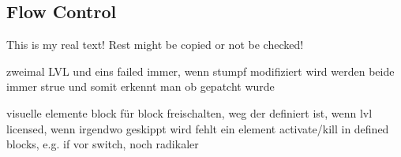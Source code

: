 \subsection{Flow Control} \label{subsection:counter-modifications-flow}
This is my real text! Rest might be copied or not be checked!


zweimal LVL und eins failed immer, wenn stumpf modifiziert wird werden beide immer strue und somit erkennt man ob gepatcht wurde

visuelle elemente block für block freischalten, weg der definiert ist, wenn lvl licensed, wenn irgendwo geskippt wird fehlt ein element
activate/kill in defined blocks, e.g. if vor switch, noch radikaler
